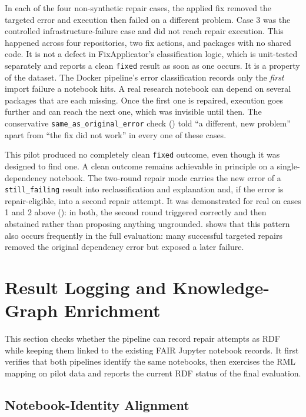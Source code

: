 In each of the four non-synthetic repair cases, the applied fix removed the 
targeted error and execution then failed on a different problem. 
Case 3 was the controlled infrastructure-failure case and did not reach repair execution.
This happened across four repositories, two fix actions, and
packages with no shared code. It is not a defect in FixApplicator's
classification logic, which is unit-tested separately and reports a clean
\texttt{fixed} result as soon as one occurs. It is a property of the
dataset. The Docker pipeline's error classification records only the
\emph{first} import failure a notebook hits. A real research notebook can
depend on several packages that are each missing. Once the first one is
repaired, execution goes further and can reach the next one, which was
invisible until then. The conservative
\texttt{same\_as\_original\_error} check () told
``a different, new problem'' apart from ``the fix did not work'' in every
one of these cases.

This pilot produced no completely clean \texttt{fixed} outcome, even
though it was designed to find one. A clean outcome remains achievable in
principle on a single-dependency notebook. The two-round repair mode
carries the new error of a \texttt{still\_failing} result into
reclassification and explanation and, if the error is repair-eligible,
into a second repair attempt. It was demonstrated for real on cases 1 and
2 above (): in both, the second round triggered correctly
and then abstained rather than proposing anything ungrounded.
 shows that this pattern also occurs frequently 
in the full evaluation: many successful targeted repairs removed the 
original dependency error but exposed a later failure.

\section{Result Logging and Knowledge-Graph Enrichment}
\label{sec:v-i6}

This section checks whether the pipeline can record repair attempts as RDF while
keeping them linked to the existing FAIR Jupyter notebook records. It first
verifies that both pipelines identify the same notebooks, then exercises the
RML mapping on pilot data and reports the current RDF status of the final
evaluation.

\subsection{Notebook-Identity Alignment}
\label{sec:v-i6-alignment}

